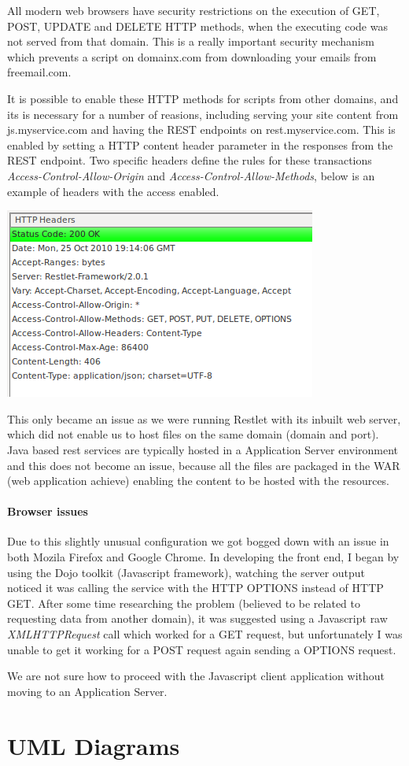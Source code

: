 \documentclass[pdftex,11pt,a4paper]{article}
\begin{document}
All modern web browsers have security restrictions on the execution of GET, POST, UPDATE and DELETE HTTP methods, when the executing code was not served from that domain. This is a really important security mechanism which prevents a script on domainx.com from downloading your emails from freemail.com.

It is possible to enable these HTTP methods for scripts from other domains, and its is necessary for a number of reasions, including serving your site content from js.myservice.com and having the REST endpoints on rest.myservice.com. This is enabled by setting a HTTP content header parameter in the responses from the REST endpoint.  Two specific headers define the rules for these transactions \emph{Access-Control-Allow-Origin} and \emph{Access-Control-Allow-Methods}, below is an example of headers with the access enabled.

\begin{center}
	\includegraphics[scale=.7]{images/content_headers.png}
\end{center}

This only became an issue as we were running Restlet with its inbuilt web server, which did not enable us to host files on the same domain (domain and port). Java based rest services are typically hosted in a Application Server environment and this does not become an issue, because all the files are packaged in the WAR (web application achieve) enabling the content to be hosted with the resources.

\paragraph{Browser issues}
Due to this slightly unusual configuration we got bogged down with an issue in both Mozila Firefox and Google Chrome. In developing the front end, I began by using the Dojo toolkit (Javascript framework)\cite{website:dojo}, watching the server output noticed it was calling the service with the HTTP OPTIONS instead of HTTP GET. After some time researching the problem (believed to be related to requesting data from another domain), it was suggested using a Javascript raw \emph{XMLHTTPRequest} call which worked for a GET request, but unfortunately I was unable to get it working for a POST request again sending a OPTIONS request. 

We are not sure how to proceed with the Javascript client application without moving to an Application Server.


\pagebreak

\section{UML Diagrams}


\pagebreak


\def\refname{}


\end{document}
